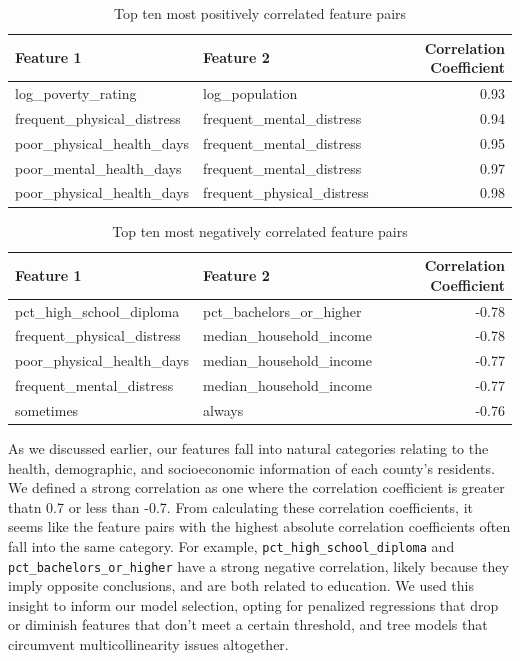 \documentclass[
]{article}
\begin{document}
\begin{table}

\caption{\label{tab:top-5-pos-corr}Top ten most positively correlated feature pairs}
\centering
\begin{tabular}[t]{llr}
\toprule
Feature 1 & Feature 2 & Correlation Coefficient\\
\midrule
log\_poverty\_rating & log\_population & 0.93\\
frequent\_physical\_distress & frequent\_mental\_distress & 0.94\\
poor\_physical\_health\_days & frequent\_mental\_distress & 0.95\\
poor\_mental\_health\_days & frequent\_mental\_distress & 0.97\\
poor\_physical\_health\_days & frequent\_physical\_distress & 0.98\\
\bottomrule
\end{tabular}
\end{table}

\begin{table}

\caption{\label{tab:top-5-neg-corr}Top ten most negatively correlated feature pairs}
\centering
\begin{tabular}[t]{llr}
\toprule
Feature 1 & Feature 2 & Correlation Coefficient\\
\midrule
pct\_high\_school\_diploma & pct\_bachelors\_or\_higher & -0.78\\
frequent\_physical\_distress & median\_household\_income & -0.78\\
poor\_physical\_health\_days & median\_household\_income & -0.77\\
frequent\_mental\_distress & median\_household\_income & -0.77\\
sometimes & always & -0.76\\
\bottomrule
\end{tabular}
\end{table}

As we discussed earlier, our features fall into natural categories relating to the health, demographic, and socioeconomic information of each county's residents. We defined a strong correlation as one where the correlation coefficient is greater thatn 0.7 or less than -0.7. From calculating these correlation coefficients, it seems like the feature pairs with the highest absolute correlation coefficients often fall into the same category. For example, \texttt{pct\_high\_school\_diploma} and \texttt{pct\_bachelors\_or\_higher} have a strong negative correlation, likely because they imply opposite conclusions, and are both related to education. We used this insight to inform our model selection, opting for penalized regressions that drop or diminish features that don't meet a certain threshold, and tree models that circumvent multicollinearity issues altogether.
\end{document}
